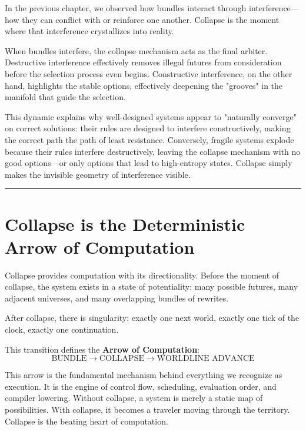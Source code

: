 In the previous chapter, we observed how bundles interact through interference—how they can conflict with or reinforce one another. Collapse is the moment where that interference crystallizes into reality.

When bundles interfere, the collapse mechanism acts as the final arbiter. Destructive interference effectively removes illegal futures from consideration before the selection process even begins. Constructive interference, on the other hand, highlights the stable options, effectively deepening the "grooves" in the manifold that guide the selection.

This dynamic explains why well-designed systems appear to "naturally converge" on correct solutions: their rules are designed to interfere constructively, making the correct path the path of least resistance. Conversely, fragile systems explode because their rules interfere destructively, leaving the collapse mechanism with no good options—or only options that lead to high-entropy states. Collapse simply makes the invisible geometry of interference visible.

\begin{center}\rule{0.5\linewidth}{0.5pt}\end{center}

\section{\texorpdfstring{\textbf{Collapse is the Deterministic Arrow of Computation}}{13.7 --- Collapse is the Deterministic Arrow of Computation}}

Collapse provides computation with its directionality. Before the moment of collapse, the system exists in a state of potentiality: many possible futures, many adjacent universes, and many overlapping bundles of rewrites.

After collapse, there is singularity: exactly one next world, exactly one tick of the clock, exactly one continuation.

This transition defines the \textbf{Arrow of Computation}:
\[ \text{BUNDLE} \rightarrow \text{COLLAPSE} \rightarrow \text{WORLDLINE ADVANCE} \]

This arrow is the fundamental mechanism behind everything we recognize as execution. It is the engine of control flow, scheduling, evaluation order, and compiler lowering. Without collapse, a system is merely a static map of possibilities. With collapse, it becomes a traveler moving through the territory. Collapse is the beating heart of computation.

